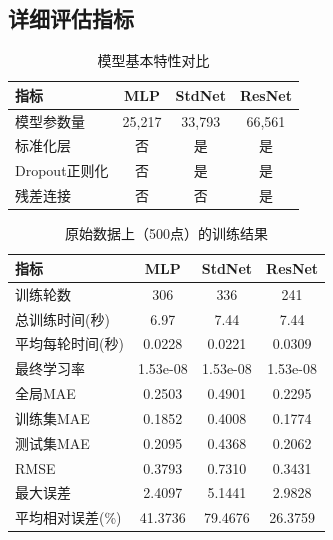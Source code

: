 \documentclass[11pt]{article}
\begin{document}
\newpage
\subsection{详细评估指标}

\begin{table}[htbp]
    \centering
    \caption{模型基本特性对比}
    \label{tab:model_basic}
    \begin{tabular}{lccc}
        \toprule
        \textbf{指标} & \textbf{MLP} & \textbf{StdNet} & \textbf{ResNet} \\
        \midrule
        模型参数量       & 25,217       & 33,793          & 66,561          \\
        标准化层        & 否            & 是               & 是               \\
        Dropout正则化  & 否            & 是               & 是               \\
        残差连接        & 否            & 否               & 是               \\
        \bottomrule
    \end{tabular}
\end{table}

\begin{table}[htbp]
    \centering
    \caption{原始数据上（500点）的训练结果}
    \label{tab:results_round1}
    \begin{tabular}{lccc}
        \toprule
        \textbf{指标} & \textbf{MLP} & \textbf{StdNet} & \textbf{ResNet} \\
        \midrule
        训练轮数        & 306          & 336             & 241             \\
        总训练时间(秒)    & 6.97         & 7.44            & 7.44            \\
        平均每轮时间(秒)   & 0.0228       & 0.0221          & 0.0309          \\
        最终学习率       & 1.53e-08     & 1.53e-08        & 1.53e-08        \\
        全局MAE       & 0.2503       & 0.4901          & 0.2295          \\
        训练集MAE      & 0.1852       & 0.4008          & 0.1774          \\
        测试集MAE      & 0.2095       & 0.4368          & 0.2062          \\
        RMSE        & 0.3793       & 0.7310          & 0.3431          \\
        最大误差        & 2.4097       & 5.1441          & 2.9828          \\
        平均相对误差(\%)  & 41.3736      & 79.4676         & 26.3759         \\
        \bottomrule
    \end{tabular}
\end{table}
\end{document}
